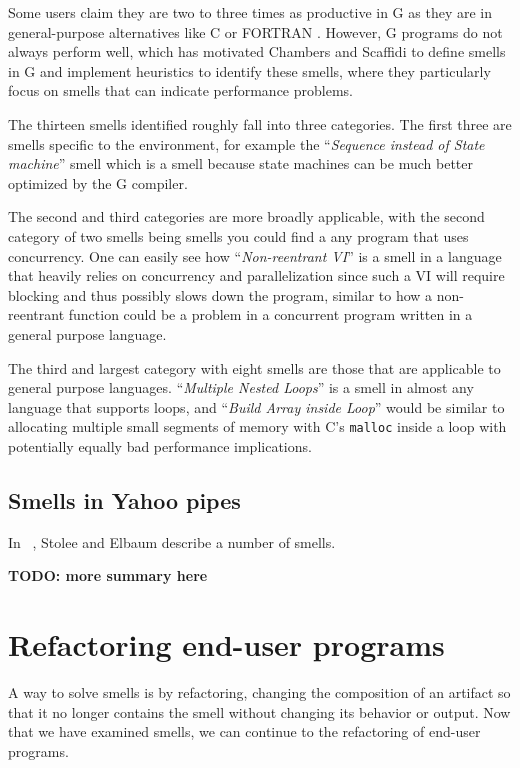 \documentclass[10pt,conference,compsocconf]{IEEEtran}
\newcommand{\todo}[1]{\textbf{TODO: #1}}
\begin{document}
Some users claim they are two to three times as productive in G as they are in general-purpose alternatives like C or FORTRAN \cite{chambers2013smell}.
However, G programs do not always perform well, which has motivated Chambers and Scaffidi \cite{chambers2013smell} to define smells in G and implement heuristics to identify these smells, where they particularly focus on smells that can indicate performance problems.

The thirteen smells identified roughly fall into three categories.
The first three are smells specific to the environment, for example the ``\textit{Sequence instead of State machine}'' smell which is a smell because state machines can be much better optimized by the G compiler.

The second and third categories are more broadly applicable, with the second category of two smells being smells you could find a any program that uses concurrency.
One can easily see how ``\textit{Non-reentrant VI}'' is a smell in a language that heavily relies on concurrency and parallelization since such a VI will require blocking and thus possibly slows down the program, similar to how a non-reentrant function could be a problem in a concurrent program written in a general purpose language.

The third and largest category with eight smells are those that are applicable to general purpose languages.
``\textit{Multiple Nested Loops}'' is a smell in almost any language that supports loops, and ``\textit{Build Array inside Loop}'' would be similar to allocating multiple small segments of memory with C's \texttt{malloc} inside a loop with potentially equally bad performance implications.

\subsection{Smells in Yahoo pipes}
In ~\cite{Stolee2011}, Stolee and Elbaum describe a number of smells. 

\todo{more summary here}

\section{Refactoring end-user programs}
\label{sec:refactoring}

A way to solve smells is by refactoring, changing the composition of an artifact so that it no longer contains the smell without changing its behavior or output.
Now that we have examined smells, we can continue to the refactoring of end-user programs.
\end{document}
